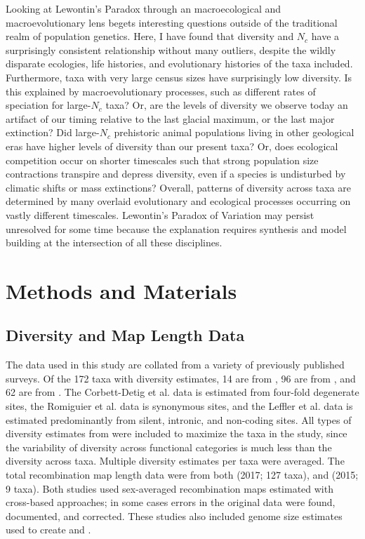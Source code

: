 \documentclass[9pt,lineno]{elife}
\begin{document}
Looking at Lewontin's Paradox through an macroecological and macroevolutionary
lens begets interesting questions outside of the traditional realm of
population genetics.  Here, I have found that diversity and $N_c$ have a
surprisingly consistent relationship without many outliers, despite the wildly
disparate ecologies, life histories, and evolutionary histories of the taxa
included. Furthermore, taxa with very large census sizes have surprisingly low
diversity. Is this explained by macroevolutionary processes, such as different
rates of speciation for large-$N_c$ taxa? Or, are the levels of diversity we
observe today an artifact of our timing relative to the last glacial maximum,
or the last major extinction? Did large-$N_c$ prehistoric animal populations
living in other geological eras have higher levels of diversity than our
present taxa? Or, does ecological competition occur on shorter timescales such
that strong population size contractions transpire and depress diversity, even
if a species is undisturbed by climatic shifts or mass extinctions? Overall,
patterns of diversity across taxa are determined by many overlaid evolutionary
and ecological processes occurring on vastly different timescales. Lewontin's
Paradox of Variation may persist unresolved for some time because the
explanation requires synthesis and model building at the intersection of all
these disciplines.


\section{Methods and Materials}

\subsection{Diversity and Map Length Data}
\label{sec:methods-diversity}

The data used in this study are collated from a variety of previously published
surveys. Of the 172 taxa with diversity estimates, 14 are from
\cite{Corbett-Detig2015-gt}, 96 are from \cite{Leffler2012-zj}, and 62 are from
\cite{Romiguier2014-bp}. The Corbett-Detig et al. data is estimated from
four-fold degenerate sites, the Romiguier et al. data is synonymous sites, and
the Leffler et al. data is estimated predominantly from silent, intronic, and
non-coding sites. All types of diversity estimates from \cite{Leffler2012-zj}
were included to maximize the taxa in the study, since the variability of
diversity across functional categories is much less than the diversity across
taxa. Multiple diversity estimates per taxa were averaged. The total
recombination map length data were from both \citeauthor{Stapley2017-fs} (2017;
127 taxa), and \citeauthor{Corbett-Detig2015-gt} (2015; 9 taxa). Both studies
used sex-averaged recombination maps estimated with cross-based approaches; in
some cases errors in the original data were found, documented, and corrected.
These studies also included genome size estimates used to create
 and .
\end{document}
